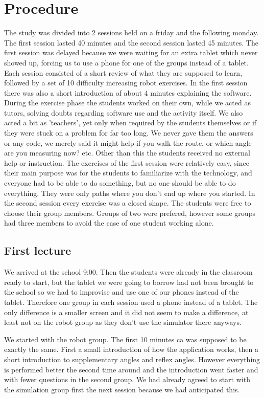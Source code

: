 \chapter{Procedure}
The study was divided into 2 sessions held on a friday and the following monday. The first session lasted 40 minutes and the second session lasted 45 minutes. The first session was delayed because we were waiting for an extra tablet which never showed up, forcing us to use a phone for one of the groups instead of a tablet. Each session consisted of a short review of what they are supposed to learn, followed by a set of 10 difficulty increasing robot exercises. In the first session there was also a short introduction of about 4 minutes explaining the software. During the exercise phase the students worked on their own, while we acted as tutors, solving doubts regarding software use and the activity itself. We also acted a bit as 'teachers', yet only when required by the students themselves or if they were stuck on a problem for far too long. We never gave them the answers or any code, we merely said it might help if you walk the route, or which angle are you measuring now? etc. Other than this the students received no external help or instruction. The exercises of the first session were relatively easy, since their main purpose was for the students to familiarize with the technology, and everyone had to be able to do something, but no one should be able to do everything. They were only paths where you don't end up where you started. In the second session every exercise was a closed shape. The students were free to choose their group members. Groups of two were prefered, however some groups had three members to avoid the case of one student working alone. 

\section{First lecture}
We arrived at the school 9:00. Then the students were already in the classroom ready to start, but the tablet we were going to borrow had not been brought to the school so we had to improvise and use one of our phones instead of the tablet. Therefore one group in each session used a phone instead of a tablet. The only difference is a smaller screen and it did not seem to make a difference, at least not on the robot group as they don't use the simulator there anyways. 

We started with the robot group. The first 10 minutes ca was supposed to be exactly the same. First a small introduction of how the application works, then a short introduction to supplementary angles and reflex angles. However everything is performed better the second time around and the introduction went faster and with fewer questions in the second group. We had already agreed to start with the simulation group first the next session because we had anticipated this.


